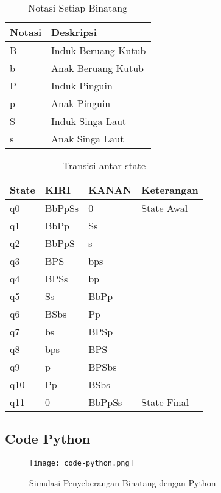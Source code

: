 \documentclass[12pt,a4paper]{article}
\begin{document}
\begin{table}[H]
\centering
\begin{tabular}{@{}ll@{}}
\toprule
\textbf{Notasi} & \textbf{Deskripsi} \\ \midrule
B & Induk Beruang Kutub \\
b & Anak Beruang Kutub \\
P & Induk Pinguin \\
p & Anak Pinguin \\
S & Induk Singa Laut \\
s & Anak Singa Laut \\ \bottomrule
\end{tabular}
\caption{Notasi Setiap Binatang}
\label{tab:notasi-binatang}
\end{table}

\begin{table}[h!]
\centering
\begin{tabular}{@{}llll@{}}
\toprule
\textbf{State} & \textbf{KIRI} & \textbf{KANAN} & \textbf{Keterangan} \\ \midrule
q0 & BbPpSs & 0        & State Awal    \\
q1 & BbPp   & Ss       &               \\
q2 & BbPpS  & s        &               \\
q3 & BPS    & bps      &               \\
q4 & BPSs   & bp       &               \\
q5 & Ss     & BbPp     &               \\
q6 & BSbs   & Pp       &               \\
q7 & bs     & BPSp     &               \\
q8 & bps    & BPS      &               \\
q9 & p      & BPSbs    &               \\
q10 & Pp    & BSbs     &               \\
q11 & 0     & BbPpSs   & State Final   \\ \bottomrule
\end{tabular}
\caption{Transisi antar state}
\end{table}

\newpage

\subsection*{Code Python}
\begin{figure}[H]
    \centering
    \texttt{[image: code-python.png]}
    \caption{Simulasi Penyeberangan Binatang dengan Python}
    \label{fig:simulation}
\end{figure}
\end{document}
